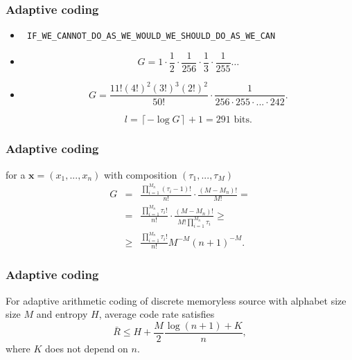 \documentclass[14pt]{beamer}
\renewcommand{\vec}[1]{\ensuremath{\boldsymbol{#1}}}
\begin{document}
\begin{frame}
\frametitle{Adaptive coding}
\begin{itemize}    


    \item {
    \footnotesize {
    \begin{center}{\texttt{
    IF{\_}WE{\_}CANNOT{\_}DO{\_}AS{\_}WE{\_}WOULD{\_}WE{\_}SHOULD{\_}DO{\_}AS{\_}WE{\_}CAN} }\\
    \end{center}    
    }
    }

    \item 
    \[
    G = 1 \cdot \frac{1}{2} \cdot \frac{1}{256} \cdot \frac{1}{3} \cdot \frac{1}{255} \ldots
    \]

    \item
    \[
    G = \frac{11!(4!)^2(3!)^3(2!)^2}{50!} \cdot \frac{1}{256 \cdot 255 \cdot ... \cdot 242}.
    \]

    \begin{equation}
    \label{examp_alg_a} l = \left\lceil { - \log G} \right\rceil + 1 = 291\mbox{ bits}.
    \end{equation}

\end{itemize}
\end{frame}


\begin{frame}
\frametitle{Adaptive coding}
\begin{itemize}    
\footnotesize {
    \item for a  $\vec x = (x_1 ,...,x_n )$ with composition $(\tau _1 ,...,\tau _M )$
    \begin{eqnarray*}
    \label{eq3_39}%
     G &=& \frac{\prod\limits_{i = 1}^{M_n } {(\tau _i -
    1)!} }{n!} \cdot \frac{(M - M_n )!}{M!} =\\
    &=&\frac{\prod\limits_{i = 1}^{M_n } {\tau _i !} }{n!} \cdot
    \frac{(M - M_n )!}{M!\prod\limits_{i = 1}^{M_n } {\tau _i } } \ge\\
    &\ge& \frac{\prod\limits_{i = 1}^{M_n } {\tau _i !} }{n!}M^{ - M}(n
    + 1)^{ - M}.
    \end{eqnarray*}
}
\end{itemize}
\end{frame}


\begin{frame}
\frametitle{Adaptive coding}  
    \begin{theorem} 
    For adaptive arithmetic coding of discrete memoryless source with alphabet size size $M$ and entropy $H$, average code rate satisfies
    \begin{equation}
    \label{eq3_40} \bar {R} \le H + \frac{M}{2}\frac{\log (n + 1) + K}{n},
    \end{equation}
    \noindent where $K$ does not depend on $n$. 
    \end{theorem}

\end{frame}
\end{document}
